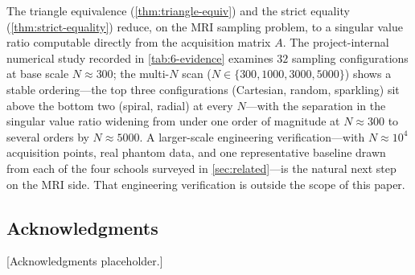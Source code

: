 The triangle equivalence (\cref{thm:triangle-equiv}) and the strict
equality (\cref{thm:strict-equality}) reduce, on the MRI sampling
problem, to a singular value ratio computable directly from the
acquisition matrix $A$. The project-internal numerical study
recorded in \cref{tab:6-evidence} examines $32$ sampling
configurations at base scale $N \approx 300$; the multi-$N$ scan
($N \in \{300, 1000, 3000, 5000\}$) shows a stable ordering---the top
three configurations (Cartesian, random, sparkling) sit above the
bottom two (spiral, radial) at every $N$---with the separation in the
singular value ratio widening from under one order of magnitude at
$N \approx 300$ to several orders by $N \approx 5000$.
A larger-scale engineering verification---with $N \approx 10^4$
acquisition points, real phantom data, and one representative
baseline drawn from each of the four schools surveyed in
\cref{sec:related}---is the natural next step on the MRI side. That
engineering verification is outside the scope of this paper.

\subsection*{Acknowledgments}

[Acknowledgments placeholder.]

